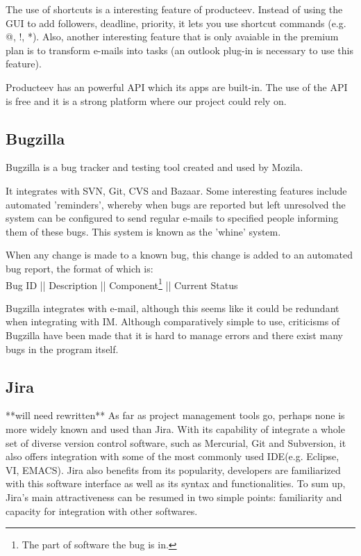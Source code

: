\documentclass[a4paper]{l3proj}
\begin{document}
The use of shortcuts is a interesting feature of producteev. Instead of using the GUI to add followers, 
deadline, priority, it lets you use shortcut commands (e.g. @, !, *). Also, another interesting feature 
that is only avaiable in the premium plan is to transform e-mails into tasks (an outlook plug-in is necessary
to use this feature).

Producteev has an powerful API which its apps are built-in. The use of the API is free and it is a strong
platform where our project could rely on.


\subsection{Bugzilla}
\label{Bugzilla}

Bugzilla is a bug tracker and testing tool created and used by Mozila.

It integrates with SVN, Git, CVS and Bazaar.  Some interesting
features include automated 'reminders', whereby when bugs are
reported but left unresolved the system can be configured to send
regular e-mails to specified people informing them of these bugs.
This system is known as the 'whine' system.  

When any change is made to a known bug, this change is added to an
automated bug report, the format of which is:\\
Bug ID || Description || Component\footnote{The part of software the
  bug is in.} || Current Status

Bugzilla integrates with e-mail, although this seems like it could be
redundant when integrating with IM.  
Although comparatively simple to use, criticisms of Bugzilla have been
made that it is hard to manage errors and there exist many bugs in the
program itself.  


\subsection{Jira}
\label{jira}
**will need rewritten**
As far as project management tools go, perhaps none is more widely known and used than Jira. 
With its capability of integrate a whole set of diverse version control software, such as Mercurial, 
Git and Subversion, it also offers integration with some of the most commonly used IDE(e.g. Eclipse, VI, EMACS). 
Jira also benefits from its popularity, developers are familiarized with this software interface as well as its 
syntax and functionalities. To sum up, Jira’s main attractiveness can be resumed in two simple points: familiarity
and capacity for integration with other softwares.
\end{document}

